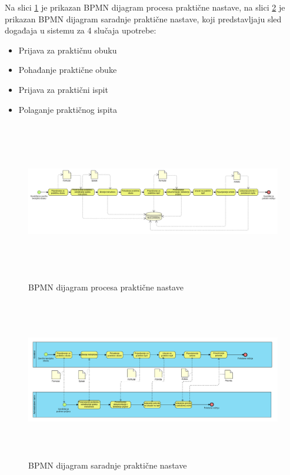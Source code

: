 

Na slici \ref{fig:bpmnP_podnosenje_zahteva} je prikazan BPMN dijagram procesa praktične nastave, 
na slici \ref{fig:bpmnS_podnosenje_zahteva} je prikazan BPMN dijagram saradnje praktične nastave, 
koji predstavljaju sled događaja u sistemu za 4 slučaja upotrebe:
\begin{itemize}
    \item Prijava za praktičnu obuku
    \item Pohađanje praktične obuke
    \item Prijava za praktični ispit
    \item Polaganje praktičnog ispita
\end{itemize}

\begin{figure}[H]
    \begin{center}
        \includegraphics[width=170mm, height=70mm]{Diagrams/bpmnP_prakticna_nastava.png}
    \end{center}
    \caption {BPMN dijagram procesa praktične nastave}
    \label{fig:bpmnP_podnosenje_zahteva}

\end{figure}

\begin{figure}[H]
    \begin{center}
        \includegraphics[width=170mm, height=70mm]{Diagrams/bpmnS_prakticna_nastava.png}
    \end{center}
    \caption {BPMN dijagram saradnje praktične nastave}
    \label{fig:bpmnS_podnosenje_zahteva}

\end{figure}

